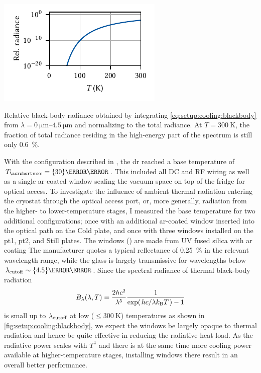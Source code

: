 \begin{marginfigure}
    \centering
    \includegraphics{img/pdf/setup/black_body_radiance}
    \caption[]{
        Relative black-body radiance obtained by integrating \cref{eq:setup:cooling:blackbody} from $\lambda = \qtyrange{0}{4.5}{\micro\meter}$ and normalizing to the total radiance.
        At $T=\qty{300}{\kelvin}$, the fraction of total radiance residing in the high-energy part of the spectrum is still only \qty{0.6}{\percent}.
    }
    \label{fig:setup:cooling:blackbody}
\end{marginfigure}

With the configuration described in , the \gls{dr} reached a base temperature of $\Tmxc = \qty{30}{\milli\kelvin}$.
This included all DC and RF wiring as well as a single \gls{ar}-coated window sealing the vacuum space on top of the fridge for optical access.
To investigate the influence of ambient thermal radiation entering the cryostat through the optical access port, or, more generally, radiation from the higher- to lower-temperature stages, I measured the base temperature for two additional configurations; once with an additional \gls{ar}-coated window inserted into the optical path on the Cold plate, and once with three windows installed on the \gls{pt1}, \gls{pt2}, and Still plates.
The windows (\thewindow) are made from UV fused silica with \gls{ar} coating
The manufacturer quotes a typical reflectance of \qty{0.25}{\percent} in the relevant wavelength range, while the glass is largely transmissive for wavelengths below $\lambda_{\mr{cutoff}}\sim\qty{4.5}{\micro\meter}$.
Since the spectral radiance of thermal black-body radiation~\cite{Planck1900}
\begin{equation}\label{eq:setup:cooling:blackbody}
    B_\lambda(\lambda, T) = \frac{2 h c^2}{\lambda^5}\frac{1}{\exp(\flatfrac{hc}{\lambda\kb T}) - 1}
\end{equation}
is small up to $\lambda_{\mathrm{cutoff}}$ at low ($\leq\qty{300}{\kelvin}$) temperatures as shown in \cref{fig:setup:cooling:blackbody}, we expect the windows be largely opaque to thermal radiation and hence be quite effective in reducing the radiative heat load.
As the radiative power scales with $T^4$ and there is at the same time more cooling power available at higher-temperature stages, installing windows there result in an overall better performance.

